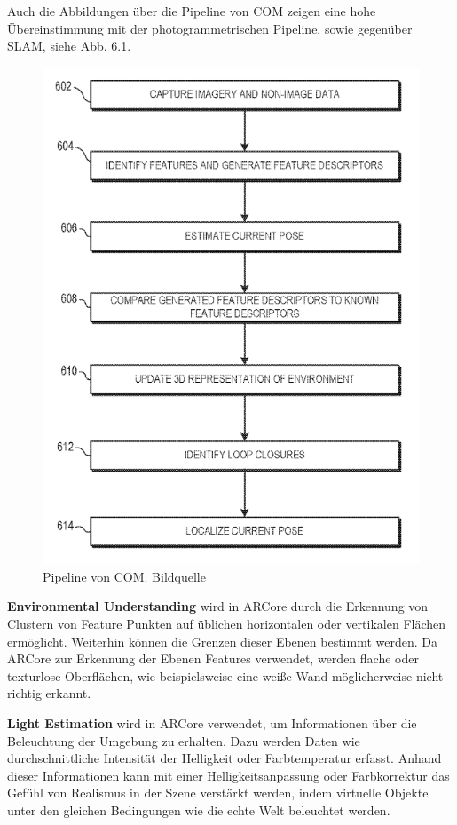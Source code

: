 Auch die Abbildungen über die Pipeline von COM zeigen eine hohe Übereinstimmung mit der photogrammetrischen Pipeline, sowie gegenüber SLAM, siehe Abb. 6.1.

\begin{figure}[H]
	\centering
	\includegraphics[scale=0.75]{com.png}
	\caption{Pipeline von COM. Bildquelle \cite{patent}}
\end{figure} 


\textbf{Environmental Understanding} wird in ARCore durch die Erkennung von Clustern von Feature Punkten auf üblichen horizontalen oder vertikalen Flächen ermöglicht. Weiterhin können die Grenzen dieser Ebenen bestimmt werden. Da ARCore zur Erkennung der Ebenen Features verwendet, werden flache oder texturlose Oberflächen, wie beispielsweise eine weiße Wand möglicherweise nicht richtig erkannt. 

\textbf{Light Estimation} wird in ARCore verwendet, um Informationen über die Beleuchtung der Umgebung zu erhalten. Dazu werden Daten wie durchschnittliche Intensität der Helligkeit oder Farbtemperatur erfasst. Anhand dieser Informationen kann mit einer Helligkeitsanpassung oder Farbkorrektur das Gefühl von Realismus in der Szene verstärkt werden, indem virtuelle Objekte unter den gleichen Bedingungen wie die echte Welt beleuchtet werden.

